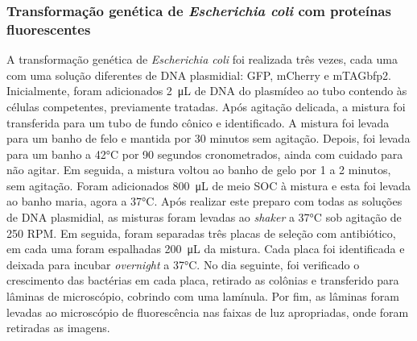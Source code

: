 \subsubsection{Transformação genética de \textit{Escherichia coli} com proteínas
fluorescentes}
A transformação genética de \textit{Escherichia coli} foi realizada três vezes,
cada uma com uma solução diferentes de DNA plasmidial: GFP, mCherry e
mTAGbfp2. Inicialmente, foram adicionados \qty{2}{\micro\liter} de DNA do
plasmídeo ao tubo contendo às células competentes, previamente tratadas. Após
agitação delicada, a mistura foi transferida para um tubo de fundo cônico e
identificado. A mistura foi levada para um banho de felo e mantida por 30
minutos sem agitação. Depois, foi levada para um banho a 42°C por 90 segundos
cronometrados, ainda com cuidado para não agitar. Em seguida, a mistura voltou
ao banho de gelo por 1 a 2 minutos, sem agitação. Foram adicionados
\qty{800}{\micro\liter} de meio SOC à mistura e esta foi levada ao banho maria,
agora a 37°C. Após realizar este preparo com todas as soluções de DNA
plasmidial, as misturas foram levadas ao \textit{shaker} a 37°C sob agitação de
250 RPM. Em seguida, foram separadas três placas de seleção com antibiótico, em
cada uma foram espalhadas \qty{200}{\micro\liter} da mistura. Cada placa foi
identificada e deixada para incubar \textit{overnight} a 37°C. No dia seguinte, foi
verificado o crescimento das bactérias em cada placa, retirado as colônias e
transferido para lâminas de microscópio, cobrindo com uma lamínula. Por fim, as
lâminas foram levadas ao microscópio de fluorescência nas faixas de luz
apropriadas, onde foram retiradas as imagens.

